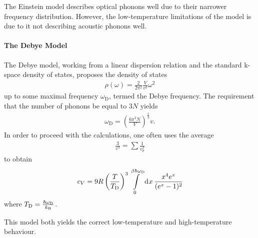 The Einstein model describes optical phonons well due to their narrower frequency distribution. However, the low-temperature limitations of the model is due to it not describing acoustic phonons well.

\paragraph{The Debye Model}
The Debye model, working from a linear dispersion relation and the standard k-space density of states, proposes the density of states
\begin{align*}
	\rho(\omega) = \frac{2}{2\pi^{2}}\frac{V}{v^{3}}\omega^{2}
\end{align*}
up to some maximal frequency $\omega_{\text{D}}$, termed the Debye frequency. The requirement that the number of phonons be equal to $3N$ yields
\begin{align*}
	\omega_{\text{D}} = \left(\frac{6\pi^{2}N}{V}\right)^{\frac{1}{3}}v.
\end{align*}
In order to proceed with the calculations, one often uses the average
\begin{align*}
	\frac{3}{v^{3}} = \sum\frac{1}{v_{p}^{3}}
\end{align*}
to obtain
\begin{align*}
	c_{V} = 9R\left(\frac{T}{T_{\text{D}}}\right)^{3}\int\limits_{0}^{\beta\hbar\omega_{\text{D}}}\dd[]{x}\frac{x^{4}e^{x}}{(e^{x} - 1)^{2}}
\end{align*}
where $T_{\text{D}} = \frac{\hbar\omega_{\text{D}}}{k_{\text{B}}}$.
	
This model both yields the correct low-temperature and high-temperature behaviour.